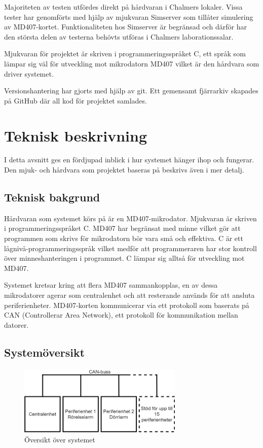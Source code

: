 \documentclass[a4paper]{article}
\begin{document}
Majoriteten av testen utfördes direkt på hårdvaran i Chalmers lokaler.
Vissa tester har genomförts med hjälp av mjukvaran Simserver som tillåter simulering av MD407-kortet.
Funktionaliteten hos Simserver är begränsad och därför har den största delen av testerna behövts utföras i Chalmers laborationssalar.

Mjukvaran för projektet är skriven i programmeringsspråket C, ett språk som lämpar sig väl för utveckling mot mikrodatorn MD407 vilket är den hårdvara som driver systemet.

Versionshantering har gjorts med hjälp av git.
Ett gemensamt fjärrarkiv skapades på GitHub där all kod för projektet samlades.

\newpage

\section{Teknisk beskrivning}
I detta avsnitt ges en fördjupad inblick i hur systemet hänger ihop och fungerar.
Den mjuk- och hårdvara som projektet baseras på beskrivs även i mer detalj.

\subsection{Teknisk bakgrund}
Hårdvaran som systemet körs på är en MD407-mikrodator.
Mjukvaran är skriven i programmeringsspråket C.
MD407 har begränsat med minne vilket gör att programmen som skrivs för mikrodatorn bör vara små och effektiva.
C är ett lågnivå-programmeringsspråk vilket medför att programmeraren har stor kontroll över minneshanteringen i programmet.
C lämpar sig alltså för utveckling mot MD407.

Systemet kretsar kring att flera MD407 sammankopplas, en av dessa mikrodatorer agerar som centralenhet och att resterande används för att ansluta periferienheter.
MD407-korten kommunicerar via ett protokoll som baserats på CAN (Controllerar Area Network), ett protokoll för kommunikation mellan datorer.

\subsection{Systemöversikt}

\begin{figure}[H]
    \centering
    \includegraphics[width=0.7\textwidth]{canbuss-pp.png}
    \caption{Översikt över systemet}
    \label{fig:oversikt}
\end{figure}
\end{document}
